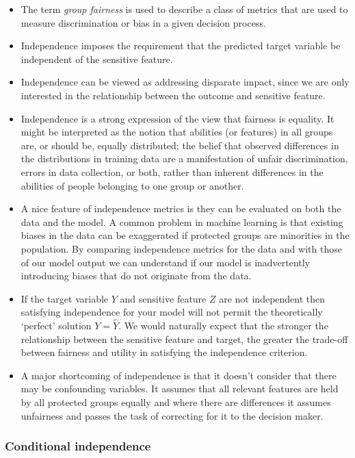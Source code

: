 \begin{itemize}[leftmargin=*]
\item The term \emph{group fairness} is used to describe a class of metrics that are used to measure discrimination or bias in a given decision process.
%
\item Independence imposes the requirement that the predicted target variable be independent of the sensitive feature.
%
\item Independence can be viewed as addressing disparate impact, since we are only interested in the relationship between the outcome and sensitive feature.
%
\item Independence is a strong expression of the view that fairness is equality. It might be interpreted as the notion that abilities (or features) in all groups are, or should be, equally distributed; the belief that observed differences in the distributions in training data are a manifestation of unfair discrimination, errors in data collection, or both, rather than inherent differences in the abilities of people belonging to one group or another.
%
\item A nice feature of independence metrics is they can be evaluated on both the data and the model. A common problem in machine learning is that existing biases in the data can be exaggerated if protected groups are minorities in the population. By comparing independence metrics for the data and with those of our model output we can understand if our model is inadvertently introducing biases that do not originate from the data.
%
\item If the target variable $Y$ and sensitive feature $Z$ are not independent then satisfying independence for your model will not permit the theoretically ‘perfect’ solution $Y = \hat{Y}$. We would naturally expect
that the stronger the relationship between the sensitive feature and target, the greater the trade-off between fairness and utility in satisfying the independence criterion.
%
\item A major shortcoming of independence is that it doesn't consider that there may be confounding variables. It assumes that all relevant features are held by all protected groups equally and where there are differences it assumes unfairness and passes the task of correcting for it to the decision maker.
\end{itemize}

\subsubsection*{Conditional independence}

